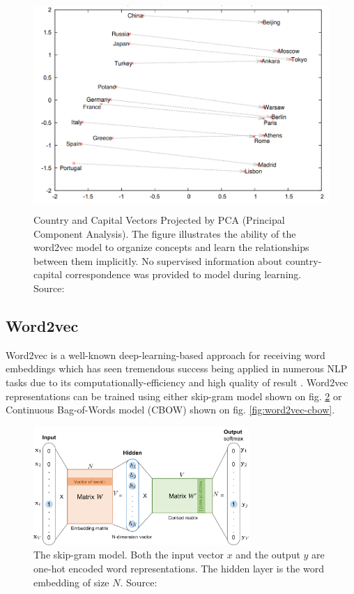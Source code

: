 \begin{figure}[h]
    \centering
    \includegraphics[height=8cm]{Images/word2vec-property.png}
    \caption{Country and Capital Vectors Projected by PCA (Principal Component Analysis). The figure illustrates the ability of the word2vec model to organize concepts and learn the relationships between them implicitly. No supervised information about country-capital correspondence was provided to model during learning. Source: \citep{Mikolov-NIPS2013}}
    \label{fig:word2vec-property}
\end{figure} 


\subsection{Word2vec} 
\label{sec:word2vec}
Word2vec is a well-known deep-learning-based approach for receiving word embeddings which has seen tremendous success being applied in numerous NLP tasks due to its computationally-efficiency and high quality of result \cite{Mikolov-NIPS2013}. Word2vec representations can be trained using either skip-gram model \citep{Mikolov-NIPS2013} shown on fig. \ref{fig:word2vec-skip-gram}  or Continuous Bag-of-Words model (CBOW) \citep{Mikolov-ICLR2013} shown on fig. \ref{fig:word2vec-cbow}.

\begin{figure}[h]
    \centering
    \includegraphics[height=4.5cm]{Images/word2vec-skip-gram.png}
    \caption{The skip-gram model. Both the input vector $x$ and the output $y$ are one-hot encoded word representations. The hidden layer is the word embedding of size $N$. Source: \citep{Weng-2017}}
    \label{fig:word2vec-skip-gram}
\end{figure} 

